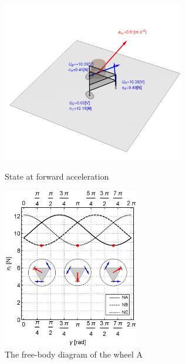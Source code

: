 \documentclass[12pt,english]{article}
\begin{document}
\begin{figure}[htb!]
	\centering
	\includegraphics[height=7cm]{figures/accelerationState}
	\caption{State at forward acceleration}
	\label{accelerationState}
	\endminipage\hfill
	\centering
	\includegraphics[height=7cm]{figures/dangerousOri.png}
	\caption{The free-body diagram of the wheel A}
	\label{dangerousOri}
	\endminipage\hfill
\end{figure}
\end{document}
